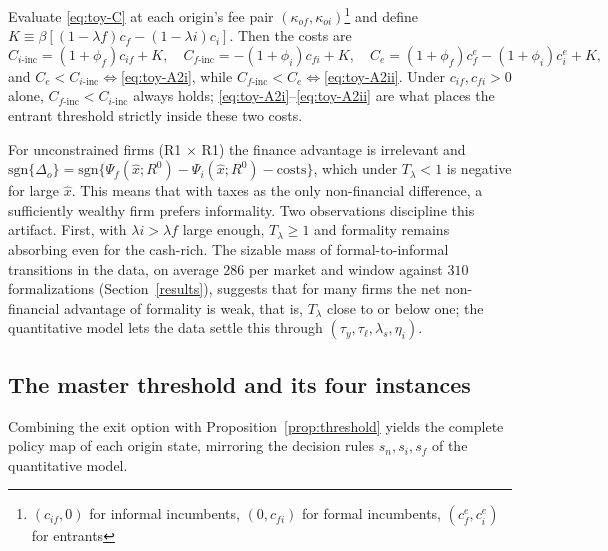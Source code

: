\documentclass[12pt]{article}
\begin{document}
\begin{lemma}
\label{lem:costorder}
Evaluate \eqref{eq:toy-C} at each origin's fee pair $(\kappa_{of},\kappa_{oi})$\footnote{$(c_{if},0)$ for informal incumbents, $(0,c_{fi})$ for formal incumbents, $(c^e_{f},c^e_{i})$ for entrants} and define $K\equiv\beta[(1-\lambda{f})c_{f}-(1-\lambda{i})c_{i}]$. Then the costs are
\begin{equation}
  C_{i\text{-inc}}=(1+\phi_{f})c_{if}+K,\quad
  C_{f\text{-inc}}=-(1+\phi_{i})c_{fi}+K,\quad
  C_{e}=(1+\phi_{f})c^e_{f}-(1+\phi_{i})c^e_{i}+K,
  \label{eq:toy-Cvalues}
\end{equation}
and $C_{e}<C_{i\text{-inc}}\iff$\eqref{eq:toy-A2i}, while $C_{f\text{-inc}}<C_{e}\iff$\eqref{eq:toy-A2ii}. Under $c_{if},c_{fi}>0$ alone, $C_{f\text{-inc}}<C_{i\text{-inc}}$ always holds; \eqref{eq:toy-A2i}--\eqref{eq:toy-A2ii} are what places the entrant threshold strictly inside these two costs.
\end{lemma}

\begin{remark}
\label{rem:toy-rich}
For unconstrained firms (R1 $\times$ R1) the finance advantage is irrelevant and $\text{sgn} \{\Delta_{o}\} = \text{sgn}\{\Psi_{f}(\hat x;R^0) -\Psi_{i}(\hat x;R^0)-\text{costs}\}$, which under $T_{\lambda}<1$ is negative for large $\hat x$. This means that with taxes as the only non-financial difference, a sufficiently wealthy firm prefers informality. Two observations discipline this artifact. First, with $\lambda{i}>\lambda{f}$ large enough, $T_{\lambda}\geq1$ and formality remains absorbing even for the cash-rich. The sizable mass of formal-to-informal transitions in the data, on average $286$ per market and window against $310$ formalizations (Section~\ref{results}), suggests that for many firms the net non-financial advantage of formality is weak, that is, $T_{\lambda}$ close to or below one; the quantitative model lets the data settle this through $(\tau_{y},\tau_{\ell},\lambda_{s},\eta_{i})$.
\end{remark}

\subsection{The master threshold and its four instances}

Combining the exit option with Proposition~\ref{prop:threshold} yields the complete policy map of each origin state, mirroring the decision rules $s_{n},s_{i},s_{f}$ of the quantitative model. 
\end{document}
